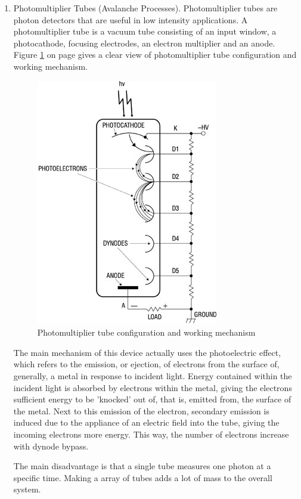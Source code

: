 \begin{enumerate}[i]
\item Photomultiplier Tubes (Avalanche Processes). Photomultiplier tubes are photon detectors that are useful in low intensity applications. A photomultiplier tube is a vacuum tube consisting of an input window, a photocathode, focusing electrodes, an electron multiplier and an anode.
Figure \ref{Photomultiplier} on page \pageref{Photomultiplier} gives a clear view of photomultiplier tube configuration and working mechanism.
\begin{figure} [ht]
	\begin{center}
\includegraphics[scale=3]{chapters/img/DO_receiver1.jpg}	
\caption{Photomultiplier tube configuration and working mechanism}
\label{Photomultiplier}
\end{center}
\end{figure}

The main mechanism of this device actually uses the photoelectric effect, which refers to the emission, or ejection, of electrons from the surface of, generally, a metal in response to incident light. Energy contained within the incident light is absorbed by electrons within the metal, giving the electrons sufficient energy to be 'knocked' out of, that is, emitted from, the surface of the metal. Next to this emission of the electron, secondary emission is induced due to the appliance of an electric field into the tube, giving the incoming electrons more energy. This way, the number of electrons increase with dynode bypass. 

The main disadvantage is that a single tube measures one photon at a specific time. Making a array of tubes adds a lot of mass to the overall system. 


\end{enumerate}
